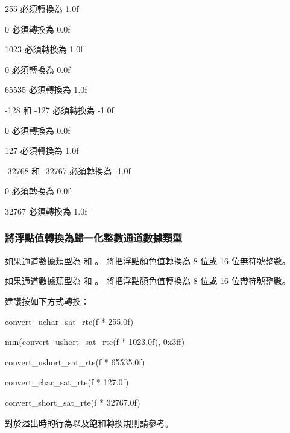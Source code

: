 255 必須轉換為 1.0f
\stopclCmmDesc

0 必須轉換為 0.0f

1023 必須轉換為 1.0f
\stopclCmmDesc

0 必須轉換為 0.0f

65535 必須轉換為 1.0f
\stopclCmmDesc

-128 和 -127 必須轉換為 -1.0f

0 必須轉換為 0.0f

127 必須轉換為 1.0f
\stopclCmmDesc

-32768 和 -32767 必須轉換為 -1.0f

0 必須轉換為 0.0f

32767 必須轉換為 1.0f
\stopclCmmDesc

\subsubsection{將浮點值轉換為歸一化整數通道數據類型}

如果通道數據類型為  和 。
 將把浮點顏色值轉換為 8 位或 16 位無符號整數。

如果通道數據類型為  和 。
 將把浮點顏色值轉換為 8 位或 16 位帶符號整數。

建議按如下方式轉換：

convert_uchar_sat_rte(f * 255.0f)
\stopclCmmDesc

min(convert_ushort_sat_rte(f * 1023.0f), 0x3ff)
\stopclCmmDesc

convert_ushort_sat_rte(f * 65535.0f)
\stopclCmmDesc

convert_char_sat_rte(f * 127.0f)
\stopclCmmDesc

convert_short_sat_rte(f * 32767.0f)
\stopclCmmDesc

對於溢出時的行為以及飽和轉換規則請參考\insection[oorbasc]。

